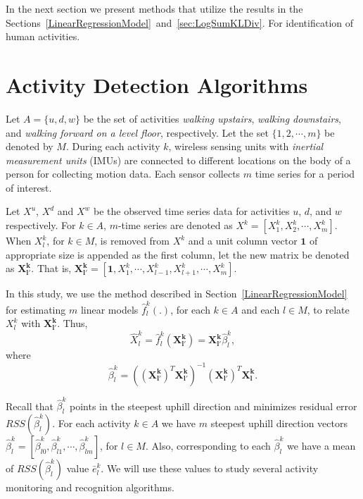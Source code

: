 \documentclass[10pt,myheadings]{IEEEtran}
\newcommand{\matr}[1]{\bm{#1}}
\begin{document}
In the next section we present methods that utilize the results in the 
Sections~\ref{LinearRegressionModel}~and~\ref{sec:LogSumKLDiv}. 
For identification of human activities.

	\section{Activity Detection Algorithms}
	\label{sec:ActivityDetectionAlgorithms}
	
	
	Let $A = \{u,d,w\}$ be the set of activities \emph{walking upstairs}, \emph{walking downstairs}, and \emph{walking forward on a level floor}, respectively. 
	Let the set $\{1,2,\cdots,m\}$ be denoted by $M$. During each activity $k$,  wireless sensing units with \emph{inertial measurement units} (IMUs) are connected to different locations on the body of a person for collecting motion data. Each sensor collects $m$ time series for a period of interest.
\par	
Let $X^u$, $X^d$ and $X^w$ be the observed time series data for activities $u$, $d$, and $w$ respectively. For $k \in A$, $m$-time series are denoted as $X^k = [X_1^k, X_2^k,\cdots,X_m^k]$. When $X_l^k$, for $k\in M$, is removed from $X^k$ and a unit column vector $\matr{1}$ of appropriate size is appended as the first column, let the new matrix be denoted as $\matr{X^k_{l'}}$. 
That is, $\matr{X^k_{l'}} = [\matr{1},X^k_1,\cdots,X^k_{l-1}, X^k_{l+1},\cdots, X^k_m]$.
	
In this study, we use the method described in Section~\ref{LinearRegressionModel} for estimating $m$ linear models $\hat{f}_l^k(.)$, for each $k\in A$ and each $l\in M$, to relate $X^k_l$ with $\matr{X^k_{l'}}$. Thus,
\begin{equation}
\hat{X}^k_l = \hat{f}^k_l(\matr{X^k_{l'}}) =  \matr{X^k_{l'}}\hat{\beta}^k_l,
\label{eq:betaEstK}
\end{equation}
where
\begin{equation}
\hat{\beta}^k_l = ((\matr{X^k_{l'}})^T\matr{X^k_{l'}})^{-1}(\matr{X^k_{l'}})^T\matr{X^k_{l}}. \nonumber
\label{eq:ErrorK}
\end{equation}

Recall that $\hat{\beta}^k_l$ points in the steepest uphill direction and minimizes residual error $RSS(\hat{\beta}^k_l)$. For each activity $k \in A$ we have $m$ steepest uphill direction vectors $\hat{\beta}^k_l =[\hat{\beta}^k_{l0}, \hat{\beta}^k_{l1},\cdots, \hat{\beta}^k_{lm}]$, for  $l \in M$. Also, corresponding to each $\hat{\beta}^k_l$ we have a mean of $RSS(\hat{\beta}^k_l)$ value $\bar{e}^k_l$.  We will use these values to study several activity monitoring and recognition algorithms.
\end{document}
